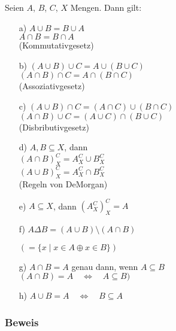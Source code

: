 \documentclass[a4paper, 12pt, twoside] {article}
\begin{document}
Seien $A$, $B$, $C$, $X$ Mengen. Dann gilt:
\begin{itemize}
	\item[a)]
		$A \cup B = B \cup A$ \\
		$A \cap B = B \cap A$ \\
		(Kommutativgesetz)
		
	\item[b)]
		$(A \cup B) \cup C = A \cup (B \cup C)$ \\	
		$(A \cap B) \cap C = A \cap (B \cap C)$ \\
		(Assoziativgesetz)
		
	\item[c)]
		$(A \cup B) \cap C = (A \cap C) \cup (B \cap C)$ \\
		$(A \cap B) \cup C = (A \cup C) \cap (B \cup C)$ \\
		(Disbributivgesetz)
		
	\item[d)]
		$A,B \subseteq X$, dann \\
		$(A \cap B)^C_X = A^C_X \cup B^C_X$ \\
		$(A \cup B)^C_X = A^C_X \cap B^C_X$ \\
		(Regeln von DeMorgan)
		
	\item[e)]
		$A \subseteq X$, dann $(A^C_X)^C_X = A$
		
	\item[f)]
		$A \Delta B = (A \cup B) \setminus (A \cap B)$
		
		$(=\{x \mid x \in A \oplus x \in B\})$
			
		\begin{venndiagram2sets}
		\fillANotB \fillBNotA
		\end{venndiagram2sets}
		
	\item[g)]
		$A \cap B = A$ genau dann, wenn $A \subseteq B$ \\
		$(A \cap B) = A \quad \Leftrightarrow \quad A \subseteq B)$
		
	\item[h)]
		$A \cup B = A \quad \Leftrightarrow \quad B \subseteq A$
\end{itemize}

\subsubsection*{Beweis}
\end{document}
